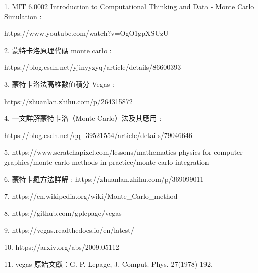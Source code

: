 \documentclass[10pt,UTF8]{ctexart}
\begin{document}
1. MIT 6.0002 Introduction to Computational Thinking and Data - Monte Carlo Simulation : 

https://www.youtube.com/watch?v=OgO1gpXSUzU

2. 蒙特卡洛原理代碼 monte carlo :

https://blog.csdn.net/yjinyyzyq/article/details/86600393

3. 蒙特卡洛法高維數值積分 Vegas :

https://zhuanlan.zhihu.com/p/264315872

4. 一文詳解蒙特卡洛（Monte Carlo）法及其應用 :

https://blog.csdn.net/qq\_39521554/article/details/79046646

5. https://www.scratchapixel.com/lessons/mathematics-physics-for-computer-graphics/monte-carlo-methods-in-practice/monte-carlo-integration

6. 蒙特卡羅方法詳解 : https://zhuanlan.zhihu.com/p/369099011

7. https://en.wikipedia.org/wiki/Monte\_Carlo\_method

8. https://github.com/gplepage/vegas

9. https://vegas.readthedocs.io/en/latest/

10. https://arxiv.org/abs/2009.05112

11. vegas 原始文獻：G. P. Lepage, J. Comput. Phys. 27(1978) 192.







\clearpage
\end{document}
